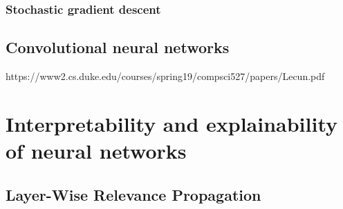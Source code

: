 \subsubsection*{Stochastic gradient descent}
\subsection{Convolutional neural networks}

https://www2.cs.duke.edu/courses/spring19/compsci527/papers/Lecun.pdf
\section{Interpretability and explainability of neural networks}
\subsection{Layer-Wise Relevance Propagation}
